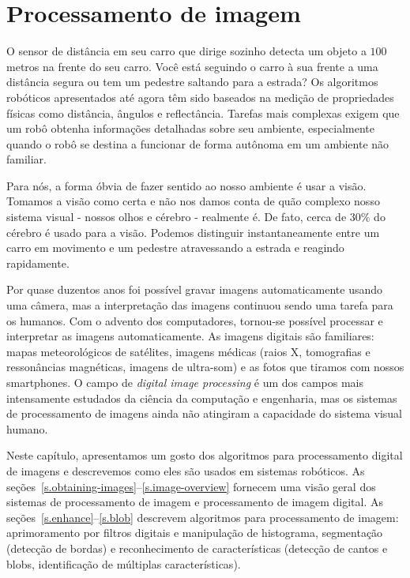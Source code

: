 
\chapter{Processamento de imagem}\label{ch.image}

O sensor de distância em seu carro que dirige sozinho detecta um objeto a $100$ metros na frente do seu carro. Você está seguindo o carro à sua frente a uma distância segura ou tem um pedestre saltando para a estrada? Os algoritmos robóticos apresentados até agora têm sido baseados na medição de propriedades físicas como distância, ângulos e reflectância. Tarefas mais complexas exigem que um robô obtenha informações detalhadas sobre seu ambiente, especialmente quando o robô se destina a funcionar de forma autônoma em um ambiente não familiar.

Para nós, a forma óbvia de fazer sentido ao nosso ambiente é usar a visão. Tomamos a visão como certa e não nos damos conta de quão complexo nosso sistema visual - nossos olhos e cérebro - realmente é. De fato, cerca de $30\%$ do cérebro é usado para a visão. Podemos distinguir instantaneamente entre um carro em movimento e um pedestre atravessando a estrada e reagindo rapidamente.

Por quase duzentos anos foi possível gravar imagens automaticamente usando uma câmera, mas a interpretação das imagens continuou sendo uma tarefa para os humanos. Com o advento dos computadores, tornou-se possível processar e interpretar as imagens automaticamente. As imagens digitais são familiares: mapas meteorológicos de satélites, imagens médicas (raios X, tomografias e ressonâncias magnéticas, imagens de ultra-som) e as fotos que tiramos com nossos smartphones. O campo de \emph{digital image processing} é um dos campos mais intensamente estudados da ciência da computação e engenharia, mas os sistemas de processamento de imagens ainda não atingiram a capacidade do sistema visual humano.

Neste capítulo, apresentamos um gosto dos algoritmos para processamento digital de imagens e descrevemos como eles são usados em sistemas robóticos. As seções~\ref{s.obtaining-images}--\ref{s.image-overview} fornecem uma visão geral dos sistemas de processamento de imagem e processamento de imagem digital. As seções~\ref{s.enhance}--\ref{s.blob} descrevem algoritmos para processamento de imagem: aprimoramento por filtros digitais e manipulação de histograma, segmentação (detecção de bordas) e reconhecimento de características (detecção de cantos e blobs, identificação de múltiplas características).

